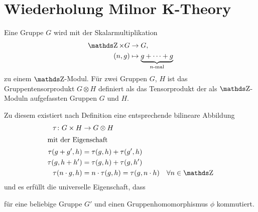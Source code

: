 \documentclass[ngerman,fontsize=11pt, paper=a4, parskip=half, titlepage=true, toc=bib]{scrartcl}
\begin{document}
\maketitle
\tableofcontents




\section{Wiederholung Milnor K-Theory}

\begin{Bem}[Gruppentensorprodukt]
  Eine Gruppe $G$ wird mit der Skalarmultiplikation
  \begin{align*}
    \Z \times G &\to G,\\
    (n,g)&\mapsto \underbrace{g+\dotsb+g}_{\scriptsize\text{$n$-mal}}
  \end{align*}
  zu einem $\Z$-Modul.
  Für zwei Gruppen $G$, $H$ ist das 
  Gruppentensorprodukt $G\otimes H$
  definiert als das Tensorprodukt der als $\Z$-Moduln
  aufgefassten Gruppen $G$ und $H$.

  Zu diesem existiert nach Definition eine 
  entsprechende bilineare Abbildung
  \begin{align*}
    \tau\colon G\times H&\rightarrow G\otimes H\\
    \intertext{mit der Eigenschaft}
    \tau(g+g',h) &= \tau(g,h)+\tau(g',h)\\
    \tau(g,h+h') &= \tau(g,h)+\tau(g,h')\\
    \tau(n\cdot g, h) &= n\cdot \tau(g,h)= \tau(g,n\cdot h)\quad
                        \forall n \in\Z
  \end{align*}
  und es erfüllt die universelle Eigenschaft, dass
  \begin{center}
  \end{center}
  für eine beliebige Gruppe $G'$ und einen Gruppenhomomorphismus $\phi$
  kommutiert.


\end{Bem}
\end{document}
